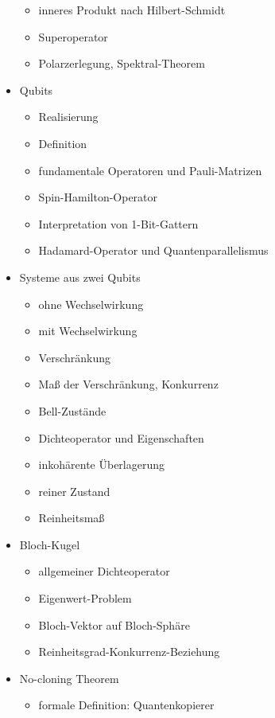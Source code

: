 \documentclass[9pt]{article}
\begin{document}
\begin{multicols}{2}
\begin{itemize}
\begin{itemize}
          \item inneres Produkt nach Hilbert-Schmidt
          \item Superoperator
          \item Polarzerlegung, Spektral-Theorem
        \end{itemize}
      \item Qubits
        \begin{itemize}
          \item Realisierung
          \item Definition
          \item fundamentale Operatoren und Pauli-Matrizen
          \item Spin-Hamilton-Operator
          \item Interpretation von 1-Bit-Gattern
          \item Hadamard-Operator und Quantenparallelismus
        \end{itemize}
      \item Systeme aus zwei Qubits
        \begin{itemize}
          \item ohne Wechselwirkung
          \item mit Wechselwirkung
          \item Verschränkung
          \item Maß der Verschränkung, Konkurrenz
          \item Bell-Zustände
          \item Dichteoperator und Eigenschaften
          \item inkohärente Überlagerung
          \item reiner Zustand
          \item Reinheitsmaß
        \end{itemize}
      \item Bloch-Kugel
        \begin{itemize}
          \item allgemeiner Dichteoperator
          \item Eigenwert-Problem
          \item Bloch-Vektor auf Bloch-Sphäre
          \item Reinheitsgrad-Konkurrenz-Beziehung
        \end{itemize}
      \item No-cloning Theorem
        \begin{itemize}
          \item formale Definition: Quantenkopierer

\end{itemize}
\end{itemize}
\end{multicols}
\end{document}
